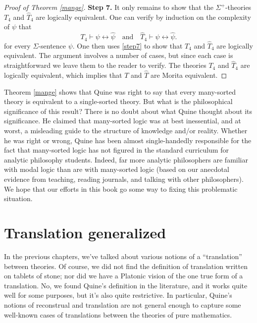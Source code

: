 \begin{proof}[Proof of Theorem \ref{mange}]
\textbf{Step 7.} It only remains to show that the $\Sigma^+$-theories
$T_{4}$ and $\widehat{T}_{4}$ are logically equivalent. One can verify
by induction on the complexity of $\psi$ that
\begin{equation}
  T_{4}\vdash\psi\leftrightarrow\widehat{\psi}\quad \text{and} \quad \widehat{T}_{4}\vdash\psi\leftrightarrow\widehat{\psi}.
\label{step7}
\end{equation}
for every $\Sigma$-sentence $\psi$. One then uses \eqref{step7} to
show that $T_{4}$ and $\widehat{T}_{4}$ are logically equivalent. The
argument involves a number of cases, but since each case is
straightforward we leave them to the reader to verify. The theories
$T_{4}$ and $\widehat{T}_{4}$ are logically equivalent, which implies
that $T$ and $\widehat{T}$ are Morita equivalent.
\end{proof}

Theorem \ref{mange} shows that Quine was right to say that every
many-sorted theory is equivalent to a single-sorted theory.  But what
is the philosophical significance of this result?  There is no doubt
about what Quine thought about its significance.  He claimed that
many-sorted logic was at best inessential, and at worst, a misleading
guide to the structure of knowledge and/or reality.  Whether he was
right or wrong, Quine has been almost single-handedly responsible for
the fact that many-sorted logic has not figured in the standard
curriculum for analytic philosophy students.  Indeed, far more
analytic philosophers are familiar with modal logic than are with
many-sorted logic (based on our anecdotal evidence from teaching,
reading journals, and talking with other philosophers).  We hope that
our efforts in this book go some way to fixing this problematic
situation.


\section{Translation generalized} \label{trans-g}

In the previous chapters, we've talked about various notions of a
``translation'' between theories.  Of course, we did not find the
definition of translation written on tablets of stone; nor did we have
a Platonic vision of the one true form of a translation.  No, we found
Quine's definition in the literature, and it works quite well for some
purposes, but it's also quite restrictive.  In particular, Quine's
notions of reconstrual and translation are not general enough to
capture some well-known cases of translations between the theories of
pure mathematics.

